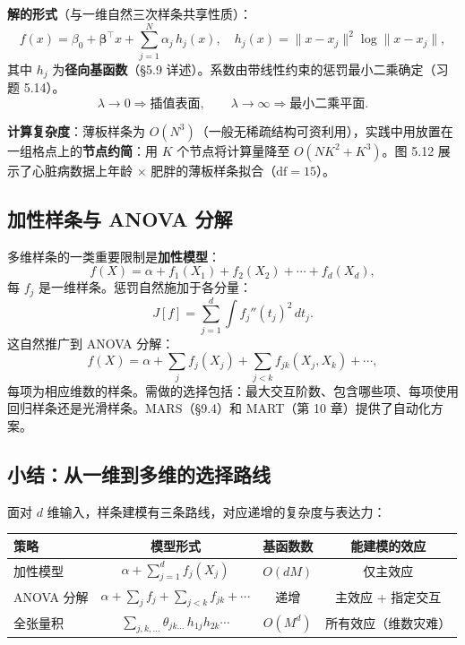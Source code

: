 \textbf{解的形式}（与一维自然三次样条共享性质）：
\[
f(x) = \beta_0 + \boldsymbol{\beta}^\top x + \sum_{j=1}^{N} \alpha_j\,h_j(x),
\quad h_j(x) = \|x - x_j\|^2 \log\|x - x_j\|,
\]
其中 $h_j$ 为\textbf{径向基函数}（§5.9 详述）。系数由带线性约束的惩罚最小二乘确定（习题 5.14）。
\[
\lambda \to 0 \Rightarrow \text{插值表面}, \qquad
\lambda \to \infty \Rightarrow \text{最小二乘平面}.
\]

\textbf{计算复杂度}：薄板样条为 $O(N^3)$（一般无稀疏结构可资利用），实践中用放置在一组格点上的\textbf{节点约简}：用 $K$ 个节点将计算量降至 $O(NK^2 + K^3)$。图 5.12 展示了心脏病数据上年龄 × 肥胖的薄板样条拟合（$\mathrm{df}=15$）。

\subsection{加性样条与 ANOVA 分解}

多维样条的一类重要限制是\textbf{加性模型}：
\[
f(X) = \alpha + f_1(X_1) + f_2(X_2) + \cdots + f_d(X_d),
\]
每 $f_j$ 是一维样条。惩罚自然施加于各分量：
\[
J[f] = \sum_{j=1}^{d} \int f_j''(t_j)^2\,dt_j.
\]
这自然推广到 ANOVA 分解：
\[
f(X) = \alpha + \sum_j f_j(X_j) + \sum_{j<k} f_{jk}(X_j, X_k) + \cdots,
\]
每项为相应维数的样条。需做的选择包括：最大交互阶数、包含哪些项、每项使用回归样条还是光滑样条。MARS（§9.4）和 MART（第 10 章）提供了自动化方案。

\subsection{小结：从一维到多维的选择路线}

面对 $d$ 维输入，样条建模有三条路线，对应递增的复杂度与表达力：

\begin{center}
\begin{tabular}{lccc}
\toprule
策略 & 模型形式 & 基函数数 & 能建模的效应 \\
\midrule
加性模型      & $\alpha + \sum_{j=1}^{d} f_j(X_j)$                        & $O(dM)$           & 仅主效应 \\
ANOVA 分解    & $\alpha + \sum_j f_j + \sum_{j<k} f_{jk} + \cdots$       & 递增              & 主效应 + 指定交互 \\
全张量积      & $\sum_{j,k,\ldots} \theta_{jk\ldots}\,h_{1j}h_{2k}\cdots$ & $O(M^d)$         & 所有效应（维数灾难） \\
\bottomrule
\end{tabular}
\end{center}

